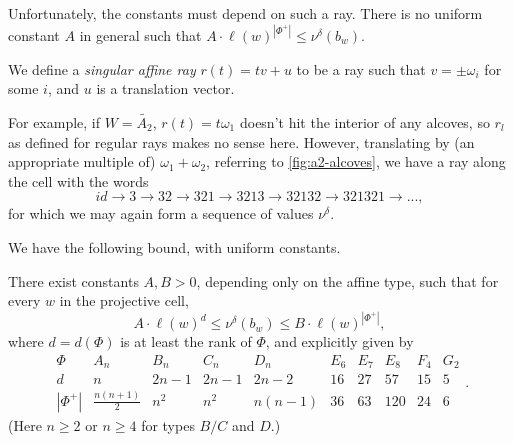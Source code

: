\documentclass[a4paper,11pt]{amsart}
\renewcommand{\dots}{\text{...}}
\newcommand{\ra}{\rightarrow}
\numberwithin{equation}{subsection}
\theoremstyle{definition}
\theoremstyle{remark}
\begin{document}
\begin{Remark}
Unfortunately, the constants must depend on such a ray. There is no uniform constant $A$ in general such that $A \cdot \ell(w)^{|\Phi^+|} \leq \nu^\delta(b_w)$. 
\end{Remark}

We define a \textit{singular affine ray} $r(t) = tv + u$ to be a ray such that $v = \pm\omega_i$ for some $i$, and $u$ is a translation vector.

\begin{Remark}
For example, if $W = \widetilde{A_2}$, $r(t) = t\omega_1$ doesn't hit the interior of any alcoves, so $r_l$ as defined for regular rays makes no sense here. However, translating by (an appropriate multiple of) $\omega_1+\omega_2$, referring to \autoref{fig:a2-alcoves}, we have a ray along the cell with the words 
\[id \ra 3 \ra 32 \ra 321 \ra 3213 \ra 32132 \ra 321321 \ra \dots,\]
for which we may again form a sequence of values $\nu^\delta$.
\end{Remark}

We have the following bound, with uniform constants.

\begin{Lemma}\label{lem:singular rays}
There exist constants \(A,B>0\), depending only on the affine type, such that
for every \(w\) in the projective cell,
\[
A\cdot \ell(w)^d
\leq
\nu^\delta(b_w)
\leq
B\cdot \ell(w)^{|\Phi^+|},
\]
where \(d=d(\Phi)\) is at least the rank of $\Phi$, and explicitly given by
\[
\begin{array}{c|ccccccccc}
\Phi & A_n & B_n & C_n & D_n & E_6 & E_7 & E_8 & F_4 & G_2 \\ \hline
d & n & 2n-1 & 2n-1 & 2n-2 & 16 & 27 & 57 & 15 & 5 \\ \hline
|\Phi^+| & \frac{n(n+1)}{2} & n^2 & n^2 & n(n-1) & 36 & 63 & 120 & 24 & 6
\end{array}
.
\]
(Here $n\geq 2$ or $n\geq 4$ for types $B/C$ and $D$.)
\end{Lemma}
\end{document}
